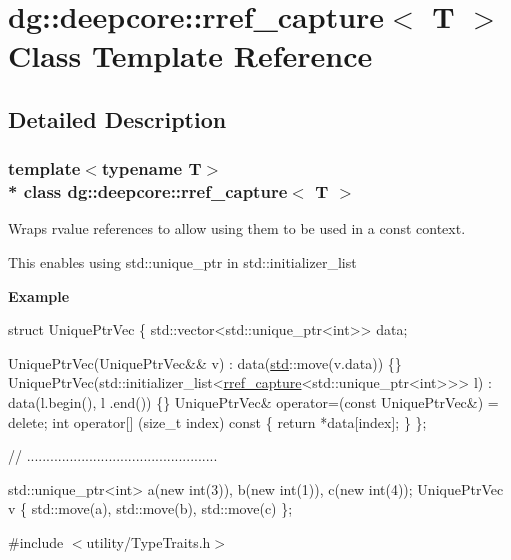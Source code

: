 \hypertarget{classdg_1_1deepcore_1_1rref__capture}{}\section{dg\+:\+:deepcore\+:\+:rref\+\_\+capture$<$ T $>$ Class Template Reference}
\label{classdg_1_1deepcore_1_1rref__capture}


\subsection{Detailed Description}
\subsubsection*{template$<$typename T$>$\\*
class dg\+::deepcore\+::rref\+\_\+capture$<$ T $>$}

Wraps rvalue references to allow using them to be used in a {\ttfamily const} context. 

This enables using {\ttfamily std\+::unique\+\_\+ptr} in {\ttfamily std\+::initializer\+\_\+list} 

{\bfseries Example} 
\begin{DoxyCode}
\textcolor{keyword}{struct }UniquePtrVec \{
  std::vector<std::unique\_ptr<int>> data;

  UniquePtrVec(UniquePtrVec&& v) : data(\hyperlink{namespacestd}{std}::move(v.data)) \{\}
  UniquePtrVec(std::initializer\_list<\hyperlink{classdg_1_1deepcore_1_1rref__capture_aab978ba67e7eaebe6be0929354cbcf75}{rref\_capture}<std::unique\_ptr<int>>> l) : data(l.begin(), l
      .end()) \{\}
  UniquePtrVec& operator=(\textcolor{keyword}{const} UniquePtrVec&) = \textcolor{keyword}{delete};
  \textcolor{keywordtype}{int} operator[] (\textcolor{keywordtype}{size\_t} index)\textcolor{keyword}{ const }\{ \textcolor{keywordflow}{return} *data[index]; \}
\};

\textcolor{comment}{// .................................................}

std::unique\_ptr<int> a(\textcolor{keyword}{new} \textcolor{keywordtype}{int}(3)), b(\textcolor{keyword}{new} \textcolor{keywordtype}{int}(1)), c(\textcolor{keyword}{new} \textcolor{keywordtype}{int}(4));
UniquePtrVec v \{ std::move(a), std::move(b), std::move(c) \};
\end{DoxyCode}
 

{\ttfamily \#include $<$utility/\+Type\+Traits.\+h$>$}

